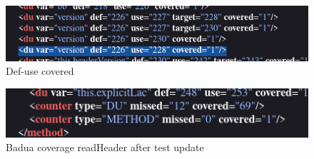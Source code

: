 \documentclass[12pt, a4paper]{article}
\begin{document}
  \begin{figure}
    \includegraphics[width=\linewidth]{./images/file_info/BaduaCoverageReadHeader3.png}
    \caption{Def-use covered}
    \label{fig:BaduaCoverageReadHeader3}
  \end{figure}

  \begin{figure}
    \includegraphics[width=\linewidth]{./images/file_info/BaduaCoverageReadHeader4.png}
    \caption{Badua coverage readHeader after test update}
    \label{fig:BaduaCoverageReadHeader4}
  \end{figure}
\end{document}
